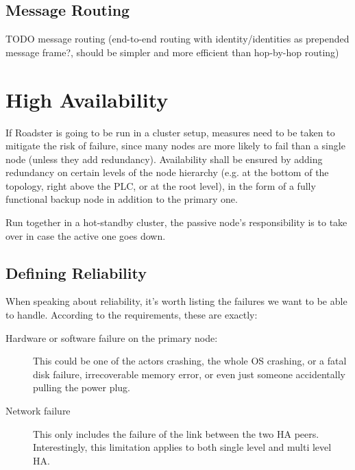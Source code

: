 \subsection{Message Routing}
TODO message routing (end-to-end routing with identity/identities as prepended message frame?, should be simpler and more efficient than hop-by-hop routing)\\

\section{High Availability}\label{sec:meth:ha}
If Roadster is going to be run in a cluster setup, measures need to be taken to
mitigate the risk of failure, since many nodes are more likely to fail than a
single node (unless they add redundancy). Availability shall be ensured by
adding redundancy on certain levels of the node hierarchy (e.g. at the bottom
of the topology, right above the PLC, or at the root level), in the form of a
fully functional backup node in addition to the primary one.

Run together in a hot-standby cluster, the passive node's responsibility is to
take over in case the active one goes down.

\subsection{Defining Reliability}
When speaking about reliability, it's worth listing the failures we want to be
able to handle. According to the requirements, these are exactly:

\begin{description}
	\item [Hardware or software failure on the primary node:]
		This could be one of the actors crashing, the whole OS
		crashing, or a fatal disk failure, irrecoverable memory error,
		or even just someone accidentally pulling the power plug.

	\item [Network failure]
		This only includes the failure of the link between the two HA
		peers. Interestingly, this limitation applies to both single
		level and multi level HA.
\end{description}


